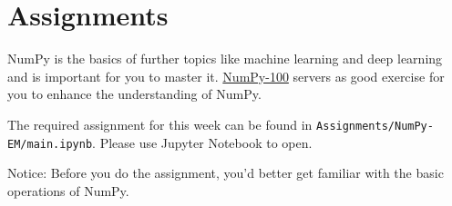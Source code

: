 \documentclass[english]{../TexTemplate/thesis}
\begin{document}
\section{Assignments}
NumPy is the basics of further topics like machine learning and deep learning and is important for you to master it.
\href{https://github.com/rougier/numpy-100}{NumPy-100} servers as good exercise for you to enhance the understanding of NumPy.

The required assignment for this week can be found in \verb'Assignments/NumPy-EM/main.ipynb'. Please use Jupyter Notebook to open.

Notice: Before you do the assignment, you'd better get familiar with the basic operations of NumPy.
\end{document}
